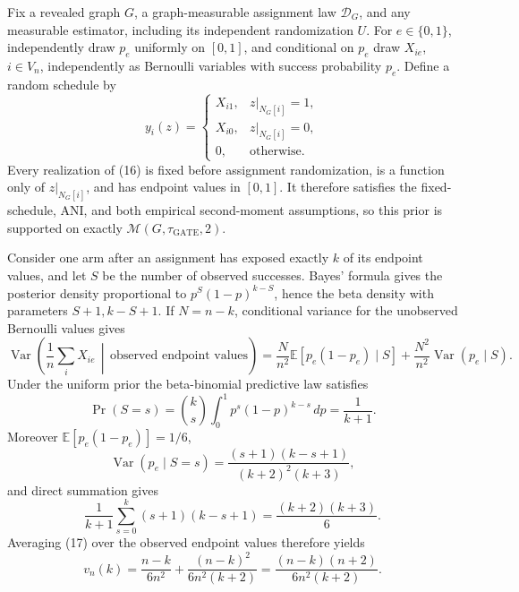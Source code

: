 Fix a revealed graph \(G\), a graph-measurable assignment law
\(\mathcal D_G\), and any measurable estimator, including its independent
randomization \(U\).  For \(e\in\{0,1\}\), independently draw
\(p_e\) uniformly on \([0,1]\), and conditional on \(p_e\) draw
\(X_{ie}\), \(i\in V_n\), independently as Bernoulli variables with
success probability \(p_e\).  Define a random schedule by
\[
y_i(z)=
\begin{cases}
X_{i1},&z|_{N_G[i]}=1,\\
X_{i0},&z|_{N_G[i]}=0,\\
0,&\text{otherwise}.
\end{cases}
\tag{16}
\]
Every realization of (16) is fixed before assignment randomization, is a
function only of \(z|_{N_G[i]}\), and has endpoint values in \([0,1]\).
It therefore satisfies the fixed-schedule, ANI, and both empirical
second-moment assumptions, so this prior is supported on exactly
\(\mathcal M(G,\tau_{\mathrm{GATE}},2)\).

Consider one arm after an assignment has exposed exactly \(k\) of its
endpoint values, and let \(S\) be the number of observed successes.
Bayes' formula gives the posterior density proportional to
\(p^S(1-p)^{k-S}\), hence the beta density with parameters
\(S+1,k-S+1\).  If \(N=n-k\), conditional variance for the unobserved
Bernoulli values gives
\[
\operatorname{Var}\!\left(\frac1n\sum_iX_{ie}\,\middle|\,\text{observed
endpoint values}\right)
=\frac{N}{n^2}\mathbb E[p_e(1-p_e)\mid S]
+\frac{N^2}{n^2}\operatorname{Var}(p_e\mid S).
\tag{17}
\]
Under the uniform prior the beta-binomial predictive law satisfies
\[
\Pr(S=s)={k\choose s}\int_0^1p^s(1-p)^{k-s}\,dp=\frac1{k+1}.
\tag{18}
\]
Moreover \(\mathbb E[p_e(1-p_e)]=1/6\),
\[
\operatorname{Var}(p_e\mid S=s)
=\frac{(s+1)(k-s+1)}{(k+2)^2(k+3)},
\]
and direct summation gives
\[
\frac1{k+1}\sum_{s=0}^k(s+1)(k-s+1)
=\frac{(k+2)(k+3)}6.
\]
Averaging (17) over the observed endpoint values therefore yields
\[
v_n(k)=\frac{n-k}{6n^2}+
\frac{(n-k)^2}{6n^2(k+2)}
=\frac{(n-k)(n+2)}{6n^2(k+2)}.
\tag{19}
\]

